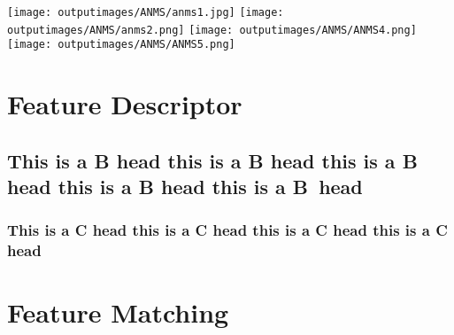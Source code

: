 \documentclass{CUP-JNL-PPS}
\begin{document}


\begin{center}
\texttt{[image: outputimages/ANMS/anms1.jpg]}
\texttt{[image: outputimages/ANMS/anms2.png]}
\texttt{[image: outputimages/ANMS/ANMS4.png]}
\texttt{[image: outputimages/ANMS/ANMS5.png]}
\end{center}

\section[]{Feature Descriptor}

\subsection{This is a B head this is a B head this is a B head this is a B head this is a B~head}
\subsubsection{This is a C head this is a C head this is a C head this is a C head}


\section{Feature Matching}
\end{document}
